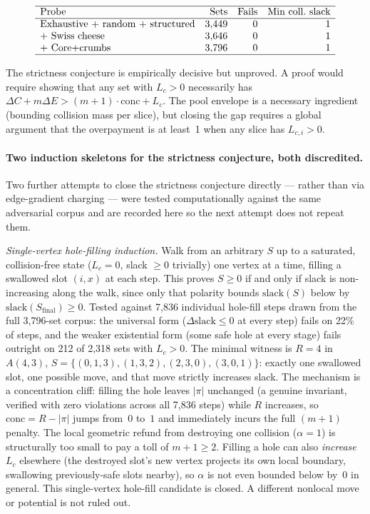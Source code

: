 \[
\begin{array}{lrrr}
\hline
\text{Probe} & \text{Sets} & \text{Fails} & \text{Min coll.\ slack} \\
\hline
\text{Exhaustive + random + structured} & 3{,}449 & 0 & 1 \\
\text{+ Swiss cheese} & 3{,}646 & 0 & 1 \\
\text{+ Core+crumbs} & 3{,}796 & 0 & 1 \\
\hline
\end{array}
\]

The strictness conjecture is empirically decisive but unproved.  A proof
would require showing that any set with $L_c>0$ necessarily has
$\Delta C+m\Delta E>(m+1)\cdot\mathrm{conc}+L_c$.  The pool envelope is a
necessary ingredient (bounding collision mass per slice), but closing the
gap requires a global argument that the overpayment is at least~1 when
any slice has $L_{c,i}>0$.

\paragraph{Two induction skeletons for the strictness conjecture, both discredited.}
Two further attempts to close the strictness conjecture directly ---
rather than via edge-gradient charging --- were tested computationally
against the same adversarial corpus and are recorded here so the next
attempt does not repeat them.

\emph{Single-vertex hole-filling induction.}
Walk from an arbitrary $S$ up to a saturated, collision-free state
($L_c=0$, slack $\ge0$ trivially) one vertex at a time, filling a
swallowed slot $(i,x)$ at each step.  This proves $S\ge0$ if and only if
slack is non-increasing along the walk, since only that polarity bounds
$\mathrm{slack}(S)$ below by $\mathrm{slack}(S_{\mathrm{final}})\ge0$.
Tested against 7,836 individual hole-fill steps drawn from the full
3,796-set corpus: the universal form ($\Delta\mathrm{slack}\le0$ at
every step) fails on 22\% of steps, and the weaker existential form
(some safe hole at every stage) fails outright on 212 of 2,318 sets with
$L_c>0$.  The minimal witness is $R=4$ in $A(4,3)$,
$S=\{(0,1,3),(1,3,2),(2,3,0),(3,0,1)\}$: exactly one swallowed slot, one
possible move, and that move strictly increases slack.  The mechanism is
a concentration cliff: filling the hole leaves $|\pi|$ unchanged (a
genuine invariant, verified with zero violations across all 7,836
steps) while $R$ increases, so $\mathrm{conc}=R-|\pi|$ jumps from~$0$
to~$1$ and immediately incurs the full $(m+1)$ penalty.  The local
geometric refund from destroying one collision ($\alpha=1$) is
structurally too small to pay a toll of $m+1\ge2$.  Filling a hole can
also \emph{increase} $L_c$ elsewhere (the destroyed slot's new vertex
projects its own local boundary, swallowing previously-safe slots
nearby), so $\alpha$ is not even bounded below by~$0$ in general.
This single-vertex hole-fill candidate is closed. A different nonlocal move
or potential is not ruled out.

